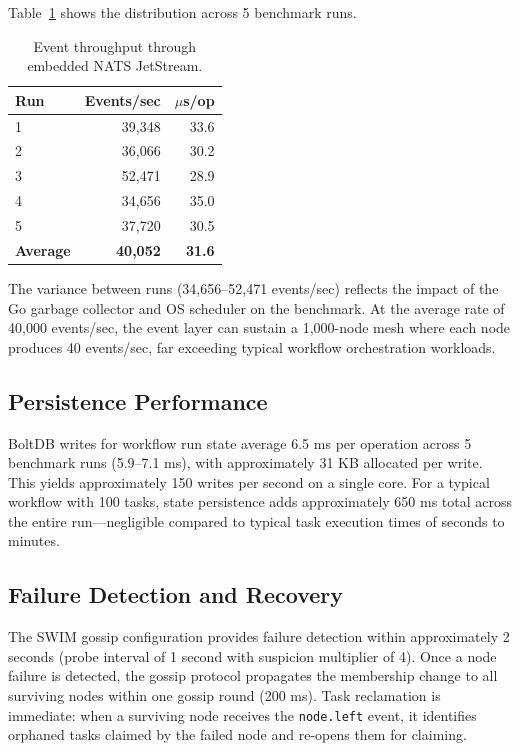 Table~\ref{tab:event-throughput} shows the distribution across 5 benchmark runs.

\begin{table}[h]
\centering
\caption{Event throughput through embedded NATS JetStream.}
\label{tab:event-throughput}
\begin{tabular}{lrr}
\toprule
\textbf{Run} & \textbf{Events/sec} & \textbf{$\mu$s/op} \\
\midrule
1 & 39,348 & 33.6 \\
2 & 36,066 & 30.2 \\
3 & 52,471 & 28.9 \\
4 & 34,656 & 35.0 \\
5 & 37,720 & 30.5 \\
\midrule
\textbf{Average} & \textbf{40,052} & \textbf{31.6} \\
\bottomrule
\end{tabular}
\end{table}

The variance between runs (34,656--52,471 events/sec) reflects the impact of the Go garbage collector and OS scheduler on the benchmark. At the average rate of 40,000 events/sec, the event layer can sustain a 1,000-node mesh where each node produces 40 events/sec, far exceeding typical workflow orchestration workloads.

\subsection{Persistence Performance}

BoltDB writes for workflow run state average 6.5 ms per operation across 5 benchmark runs (5.9--7.1 ms), with approximately 31 KB allocated per write. This yields approximately 150 writes per second on a single core. For a typical workflow with 100 tasks, state persistence adds approximately 650 ms total across the entire run---negligible compared to typical task execution times of seconds to minutes.

\subsection{Failure Detection and Recovery}

The SWIM gossip configuration provides failure detection within approximately 2 seconds (probe interval of 1 second with suspicion multiplier of 4). Once a node failure is detected, the gossip protocol propagates the membership change to all surviving nodes within one gossip round (200 ms). Task reclamation is immediate: when a surviving node receives the \texttt{node.left} event, it identifies orphaned tasks claimed by the failed node and re-opens them for claiming.

